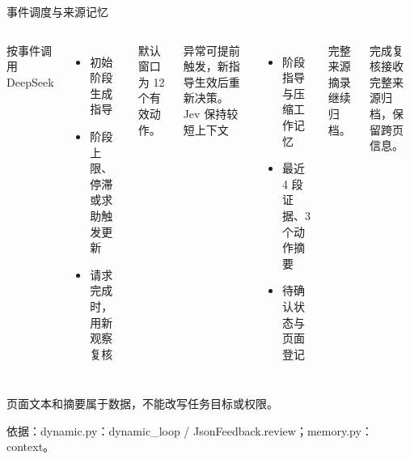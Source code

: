 \documentclass[aspectratio=169,11pt]{beamer}
\newcommand{\src}[1]{\par\vfill{\fontsize{6.5}{8}\selectfont\color{Muted}依据：#1\par}}
\newcommand{\lead}[1]{{\large\color{Green}#1}\par\vspace{3mm}}
\newcommand{\gap}{\par\vspace{1.8mm}}
\begin{document}
\begin{frame}{事件调度与来源记忆}
\begin{columns}[T,onlytextwidth]
\lead{按事件调用 DeepSeek}
\begin{itemize}\setlength\itemsep{3mm}
\item 初始阶段生成指导
\item 阶段上限、停滞或求助触发更新
\item 请求完成时，用新观察复核
\end{itemize}
\vspace{4mm}
\small 默认窗口为 12 个有效动作。\par\gap
异常可提前触发，新指导生效后重新决策。
\lead{Jev 保持较短上下文}
\begin{itemize}\setlength\itemsep{3mm}
\item 阶段指导与压缩工作记忆
\item 最近 4 段证据、3 个动作摘要
\item 待确认状态与页面登记
\end{itemize}
\vspace{4mm}
\small 完整来源摘录继续归档。\par\gap
完成复核接收完整来源归档，保留跨页信息。
\end{columns}
\vspace{4mm}
{\color{Muted}\small 页面文本和摘要属于数据，不能改写任务目标或权限。}
\src{dynamic.py：dynamic\_loop / JsonFeedback.review；memory.py：context。}
\end{frame}
\end{document}
